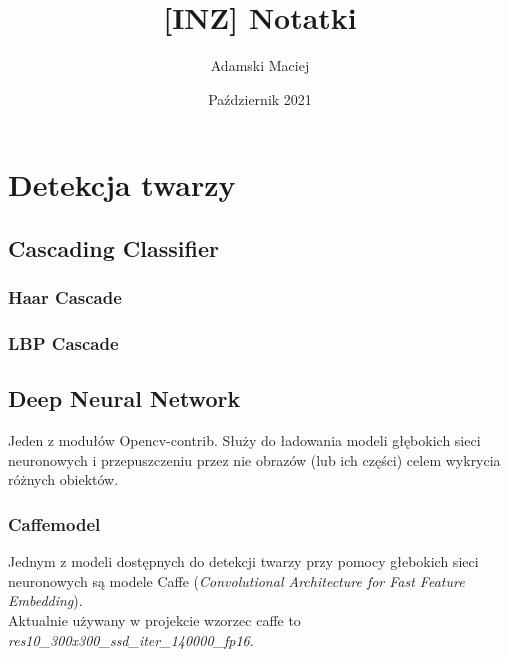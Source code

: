 \documentclass[10pt, a4paper]{article}
\title{[INZ] Notatki}
\author{Adamski Maciej}
\date{Październik 2021}
\begin{document}
\maketitle

\section{Detekcja twarzy}

\subsection{Cascading Classifier}

\subsubsection{Haar Cascade}

\subsubsection{LBP Cascade}




\subsection{Deep Neural Network}
Jeden z modułów Opencv-contrib. Służy do ładowania modeli głębokich sieci neuronowych i przepuszczeniu przez nie obrazów (lub ich części) celem wykrycia różnych obiektów.

\subsubsection{Caffemodel}
Jednym z modeli dostępnych do detekcji twarzy przy pomocy głebokich sieci neuronowych są modele Caffe (\textit{Convolutional Architecture for Fast Feature Embedding}).\\
Aktualnie używany w projekcie wzorzec caffe to \\\textit{res10{\_}300x300{\_}ssd{\_}iter{\_}140000{\_}fp16}.
\end{document}
